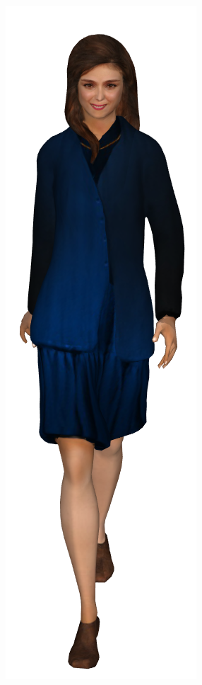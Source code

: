 
\begin{figure}[h]
  \centering
  \begin{subfigure}[b]{.22\textwidth}
    \includegraphics[width=\textwidth]{figures/woman/cropped/0.png}

\end{subfigure}
\end{figure}
